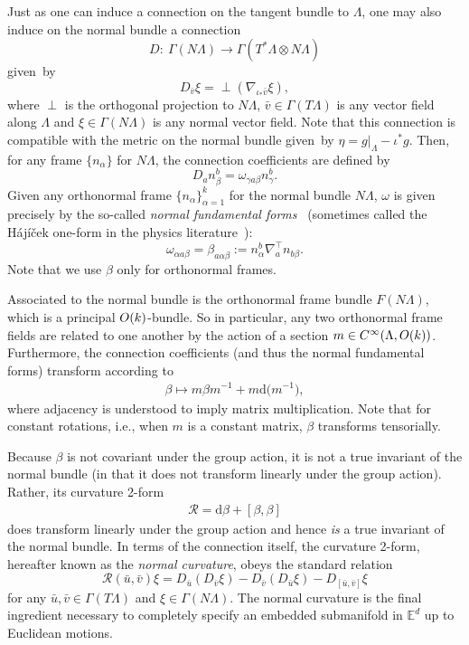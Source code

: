 \documentclass[10pt,a4paper]{article}
\numberwithin{equation}{section}
\renewcommand{\=}{\stackrel \Lambda =}
\begin{document}
Just as one can induce a connection on the tangent bundle to $\Lambda$, one may also induce on the normal bundle a connection
\[
D \colon \ \Gamma(N \Lambda) \rightarrow \Gamma(T^* \Lambda \otimes N \Lambda)
\]
given~by
\[
D_{\bar v} \xi = {\perp} (\nabla_{\iota_* \bar{v}} \xi) ,
\]
where $\perp$ is the orthogonal projection to $N \Lambda$, $\bar{v} \in \Gamma(T \Lambda)$ is any vector field along $\Lambda$ and $\xi \in \Gamma(N \Lambda)$ is any normal vector field. Note that this connection is compatible with the metric on the normal bundle given~by $\eta = g|_{\Lambda} - \iota^* g$. Then, for any frame $\{n_{\alpha}\}$ for $N \Lambda$, the connection coefficients are defined by
\[
D_a n^b_{\beta} = \omega_{\gamma a \beta} n^b_{\gamma} .
\]
Given any orthonormal frame $\{n_{\alpha}\}_{\alpha = 1}^k$ for the normal bundle $N \Lambda$, $\omega$ is given precisely by the so-called \textit{normal fundamental forms}~\cite{Spivak} (sometimes called the H{\'a}j{\'i}{\v{c}}ek one-form in the physics literature~\cite{hajicek1975, hajicek1973}):
\[
\omega_{\alpha a \beta} = \beta_{a \alpha \beta} := n^b_{\alpha} \nabla^\top_a n_{b \beta} .
\]
Note that we use $\beta$ only for orthonormal frames.

Associated to the normal bundle is the orthonormal frame bundle $F(N \Lambda)$, which is a principal ${\rm O}(k)$-bundle. So in particular, any two orthonormal frame fields are related to one another by the action of a section $m \in C^\infty(\Lambda, {\rm O}(k))$. Furthermore, the connection coefficients (and thus the normal fundamental forms) transform according to
\begin{align} \label{beta-transf}
\beta \mapsto m \beta m^{-1} + m \mathrm{d} \bigl(m^{-1}\bigr) ,
\end{align}
where adjacency is understood to imply matrix multiplication.
Note that for constant rotations, i.e., when $m$ is a constant matrix, $\beta$ transforms tensorially.

Because $\beta$ is not covariant under the group action, it is not a true invariant of the normal bundle (in that it does not transform linearly under the group action). Rather, its curvature 2-form
\begin{align} \label{norm-curv}
\mathcal{R} = \mathrm{d} \beta + [\beta, \beta]
\end{align}
does transform linearly under the group action and hence \textit{is} a true invariant of the normal bundle. In terms of the connection itself, the curvature 2-form, hereafter known as the \textit{normal curvature}, obeys the standard relation
\[
\mathcal{R}(\bar{u},\bar{v}) \xi = D_{\bar{u}} (D_{\bar{v}} \xi) - D_{\bar{v}} (D_{\bar{u}} \xi) - D_{[\bar{u},\bar{v}]} \xi
\]
for any $\bar{u},\bar{v} \in \Gamma(T \Lambda)$ and $\xi \in \Gamma(N \Lambda)$. The normal curvature is the final ingredient necessary to completely specify an embedded submanifold in $\mathbb{E}^d$ up to Euclidean motions.
\end{document}
